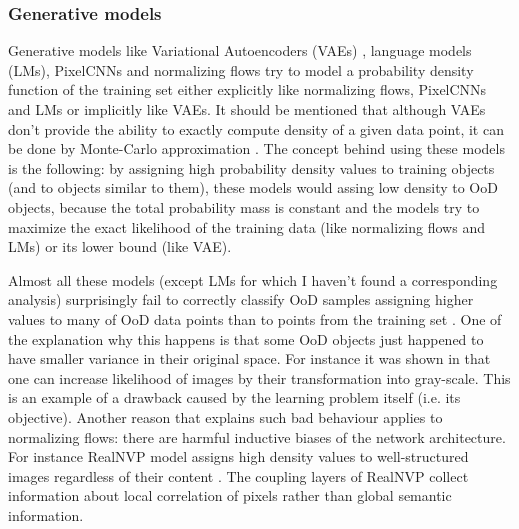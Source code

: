\documentclass{article}
\begin{document}
\subsubsection{Generative models}
    Generative models like Variational Autoencoders (VAEs) \cite{vae}, language models (LMs), PixelCNNs and normalizing flows try to model a probability density function of the training set either explicitly like normalizing flows, PixelCNNs and LMs or implicitly like VAEs. It should be mentioned that although VAEs don't provide the ability to exactly compute density of a given data point, it can be done by Monte-Carlo approximation \cite{vae}. The concept behind using these models is the following: by assigning high probability density values to training objects (and to objects similar to them), these models would assing low density to OoD objects, because the total probability mass is constant and the models try to maximize the exact likelihood of the training data (like normalizing flows and LMs) or its lower bound (like VAE).

    Almost all these models (except LMs for which I haven't found a corresponding analysis) surprisingly fail to correctly classify OoD samples assigning higher values to many of OoD data points than to points from the training set \cite{do_dont_know}. One of the explanation why this happens is that some OoD objects just happened to have smaller variance in their original space. For instance it was shown in \cite{do_dont_know} that one can increase likelihood of images by their transformation into gray-scale. This is an example of a drawback caused by the learning problem itself (i.e. its objective). Another reason that explains such bad behaviour applies to normalizing flows: there are harmful inductive biases of the network architecture. For instance RealNVP model assigns high density values to well-structured images regardless of their content \cite{norm_flows_fail}. The coupling layers of RealNVP collect information about local correlation of pixels rather than global semantic information.
\end{document}
